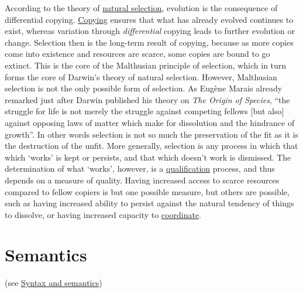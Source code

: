 \documentclass[12pt]{article}
\begin{document}
According to the theory of \hyperlink{natural_selection}{natural
  selection}, evolution is the consequence of differential
copying. \hyperlink{copying_and_coding}{Copying} ensures that what has
already evolved continues to exist, whereas variation through {\em
  differential} copying leads to further evolution or
change. Selection then is the long-term result of copying, because as
more copies come into existence and resources are scarce, some copies
are bound to go extinct. This is the core of the Malthusian principle
of selection, which in turn forms the core of Darwin's theory of
natural selection. However, Malthusian selection is not the only
possible form of selection. As Eug\`ene Marais already remarked just
after Darwin published his theory on {\em The Origin of Species}, ``the
struggle for life is not merely the struggle against competing fellows
[but also] against opposing laws of matter which make for dissolution
and the hindrance of growth''. In other words selection is not so much
the preservation of the fit as it is the destruction of the unfit. More 
generally, selection is any process in which that which `works' is kept
or persists, and that which doesn't work is dismissed. The
determination of what `works', however, is a
\hyperlink{qualification}{qualification} process, and thus depends on
a measure of quality. Having increased access to scarce resources
compared to fellow copiers is but one possible measure, but others are
possible, such as having increased ability to persist against the
natural tendency of things to dissolve, or having increased capacity
to \hyperlink{coordinate}{coordinate}.

\section{Semantics}  (see \hyperlink{syntax_and_semantics}{Syntax and semantics})
\end{document}
